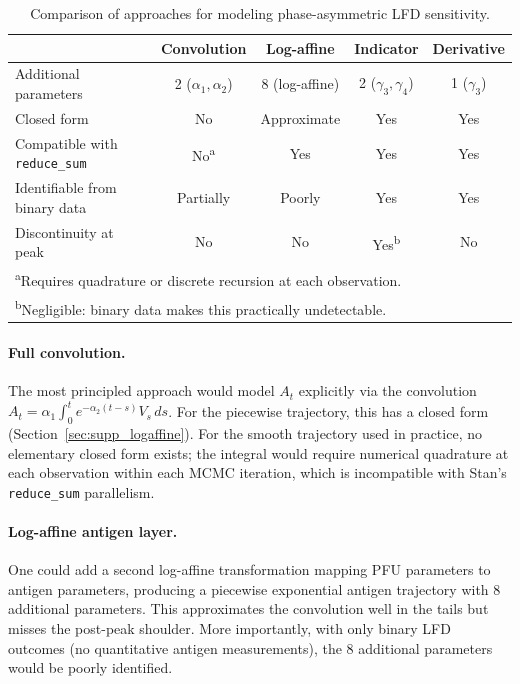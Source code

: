 \begin{appendix}
\begin{table}[h]
\centering
\caption{Comparison of approaches for modeling phase-asymmetric LFD sensitivity.}
\label{tab:lfd_approaches}
\begin{tabular}{lcccc}
\toprule
 & Convolution & Log-affine & Indicator & Derivative \\
\midrule
Additional parameters & 2 ($\alpha_1, \alpha_2$) & 8 (log-affine) & 2 ($\gamma_3, \gamma_4$) & 1 ($\gamma_3$) \\
Closed form & No & Approximate & Yes & Yes \\
Compatible with \texttt{reduce\_sum} & No\textsuperscript{a} & Yes & Yes & Yes \\
Identifiable from binary data & Partially & Poorly & Yes & Yes \\
Discontinuity at peak & No & No & Yes\textsuperscript{b} & No \\
\bottomrule
\multicolumn{5}{l}{\textsuperscript{a}Requires quadrature or discrete recursion at each observation.} \\
\multicolumn{5}{l}{\textsuperscript{b}Negligible: binary data makes this practically undetectable.}
\end{tabular}
\end{table}

\paragraph{Full convolution.} The most principled approach would model $A_t$ explicitly via the convolution $A_t = \alpha_1 \int_0^t e^{-\alpha_2(t-s)} V_s\,ds$. For the piecewise trajectory, this has a closed form (Section~\ref{sec:supp_logaffine}). For the smooth trajectory used in practice, no elementary closed form exists; the integral would require numerical quadrature at each observation within each MCMC iteration, which is incompatible with Stan's \texttt{reduce\_sum} parallelism.

\paragraph{Log-affine antigen layer.} One could add a second log-affine transformation mapping PFU parameters to antigen parameters, producing a piecewise exponential antigen trajectory with 8 additional parameters. This approximates the convolution well in the tails but misses the post-peak shoulder. More importantly, with only binary LFD outcomes (no quantitative antigen measurements), the 8 additional parameters would be poorly identified.


\end{appendix}
